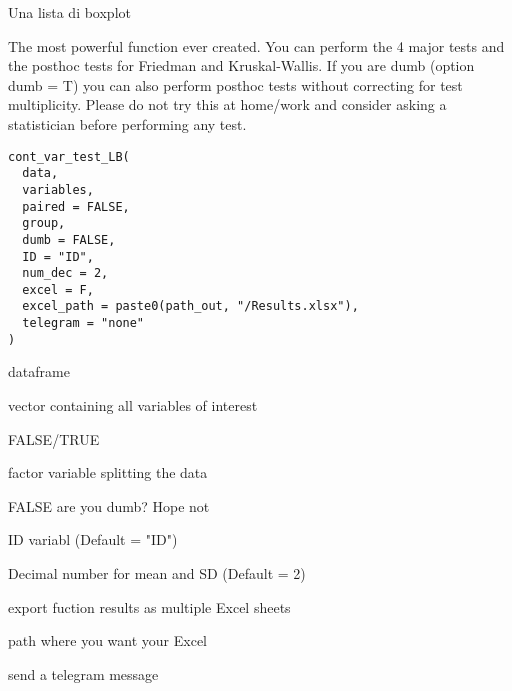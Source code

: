 \documentclass[a4paper]{book}
\begin{document}
%
\begin{Value}
Una lista di boxplot
\end{Value}
%
\begin{Description}
The most powerful function ever created. You can perform the 4 major tests and the posthoc tests for Friedman and Kruskal-Wallis.
If you are dumb (option dumb = T) you can also perform posthoc tests without correcting for test multiplicity.
Please do not try this at home/work and consider asking a statistician before performing any test.
\end{Description}
%
\begin{Usage}
\begin{verbatim}
cont_var_test_LB(
  data,
  variables,
  paired = FALSE,
  group,
  dumb = FALSE,
  ID = "ID",
  num_dec = 2,
  excel = F,
  excel_path = paste0(path_out, "/Results.xlsx"),
  telegram = "none"
)
\end{verbatim}
\end{Usage}
%
\begin{Arguments}
\begin{ldescription}
\item[\code{data}] dataframe

\item[\code{variables}] vector containing all variables of interest

\item[\code{paired}] FALSE/TRUE

\item[\code{group}] factor variable splitting the data

\item[\code{dumb}] FALSE are you dumb? Hope not

\item[\code{ID}] ID variabl (Default = "ID")

\item[\code{num\_dec}] Decimal number for mean and SD (Default = 2)

\item[\code{excel}] export fuction results as multiple Excel sheets

\item[\code{excel\_path}] path where you want your Excel

\item[\code{telegram}] send a telegram message
\end{ldescription}
\end{Arguments}
\end{document}
